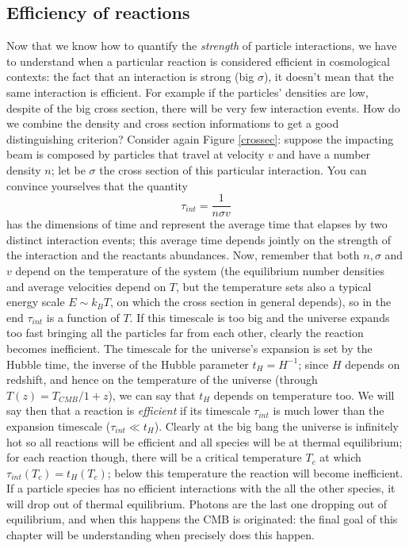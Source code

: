 \subsection{Efficiency of reactions}
Now that we know how to quantify the \textit{strength} of particle interactions, we have to understand when a particular reaction is considered efficient in cosmological contexts: the fact that an interaction is strong (big $\sigma$), it doesn't mean that the same interaction is efficient. For example if the particles' densities are low, despite of the big cross section, there will be very few interaction events. How do we combine the density and cross section informations to get a good distinguishing criterion? Consider again Figure \ref{crossec}: suppose the impacting beam is composed by particles that travel at velocity $v$ and have a number density $n$; let be $\sigma$ the cross section of this particular interaction. You can convince yourselves that the quantity
\begin{equation}
\tau_{int}=\frac{1}{n\sigma v}
\end{equation} 
has the dimensions of time and represent the average time that elapses by two distinct interaction events; this average time depends jointly on the strength of the interaction and the reactants abundances. Now, remember that both $n,\sigma$ and $v$ depend on the temperature of the system (the equilibrium number densities and average velocities depend on $T$, but the temperature sets also a typical energy scale $E\sim k_BT$, on which the cross section in general depends), so in the end $\tau_{int}$ is a function of $T$. If this timescale is too big and the universe expands too fast bringing all the particles far from each other, clearly the reaction becomes inefficient. The timescale for the universe's expansion is set by the Hubble time, the inverse of the Hubble parameter $t_H=H^{-1}$; since $H$ depends on redshift, and hence on the temperature of the universe (through $T(z)=T_{CMB}/1+z$), we can say that $t_H$ depends on temperature too. We will say then that a reaction is \textit{efficient} if its 
timescale $\tau_{int}$ is much lower than the expansion timescale ($\tau_{int}\ll t_H$). Clearly at the big bang the universe is infinitely hot so all reactions will be efficient and all species will be at thermal equilibrium; for each reaction though, there will be a critical temperature $T_c$ at which $\tau_{int}(T_c)=t_H(T_c)$; below this temperature the reaction will become inefficient. If a particle species has no efficient interactions with the all the other species, it will drop out of thermal equilibrium. Photons are the last one dropping out of equilibrium, and when this happens the CMB is originated: the final goal of this chapter will be understanding when precisely does this happen. 

